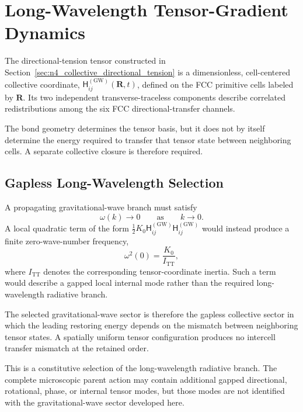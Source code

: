 \section{Long-Wavelength Tensor-Gradient Dynamics}
\label{sec:n5_long_wavelength_tensor}

The directional-tension tensor constructed in Section~\ref{sec:n4_collective_directional_tension} is a dimensionless, cell-centered collective coordinate, $\mathsf{H}_{ij}^{(\mathrm{GW})}(\mathbf{R},t)$, defined on the FCC primitive cells labeled by $\mathbf{R}$. Its two independent transverse-traceless components describe correlated redistributions among the six FCC directional-transfer channels.

The bond geometry determines the tensor basis, but it does not by itself determine the energy required to transfer that tensor state between neighboring cells. A separate collective closure is therefore required.

\subsection{Gapless Long-Wavelength Selection}
\label{subsec:gapless_selection}

A propagating gravitational-wave branch must satisfy
\begin{equation}
    \omega(k)\rightarrow 0 \qquad \text{as} \qquad k\rightarrow 0.
\end{equation}
A local quadratic term of the form $\frac{1}{2} K_{0} \mathsf{H}_{ij}^{(\mathrm{GW})} \mathsf{H}_{ij}^{(\mathrm{GW})}$ would instead produce a finite zero-wave-number frequency,
\begin{equation}
    \omega^{2}(0) = \frac{K_{0}}{I_{\mathrm{TT}}},
\end{equation}
where $I_{\mathrm{TT}}$ denotes the corresponding tensor-coordinate inertia. Such a term would describe a gapped local internal mode rather than the required long-wavelength radiative branch.

The selected gravitational-wave sector is therefore the gapless collective sector in which the leading restoring energy depends on the mismatch between neighboring tensor states. A spatially uniform tensor configuration produces no intercell transfer mismatch at the retained order.

This is a constitutive selection of the long-wavelength radiative branch. The complete microscopic parent action may contain additional gapped directional, rotational, phase, or internal tensor modes, but those modes are not identified with the gravitational-wave sector developed here.

